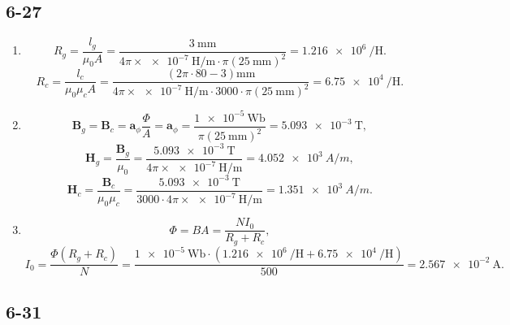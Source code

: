 \documentclass[11pt,a4paper]{article}
\author{\href{liuyh615@sjtu.edu.cn}{Yihao Liu} (515370910207)}
\subtitle{Homework}
\begin{document}
\maketitle

\subsection{6-27}
\begin{enumerate}[label=\alph*)]
\item
$$R_g=\frac{l_g}{\mu_0A}=\frac{\SI{3}{\milli\meter}}{4\pi\times\SI{e-7}{\henry/\meter}\cdot\pi(\SI{25}{\milli\meter})^2}=\SI{1.216e6}{\per\henry}.$$
$$R_c=\frac{l_c}{\mu_0\mu_cA}=\frac{(2\pi\cdot 80-3)\si{\milli\meter}}{4\pi\times\SI{e-7}{\henry/\meter}\cdot3000\cdot\pi(\SI{25}{\milli\meter})^2}=\SI{6.75e4}{\per\henry}.$$
\item
$$\mathbf{B}_g=\mathbf{B}_c=\mathbf{a}_\phi\frac{\Phi}{A}=\mathbf{a}_\phi=\frac{\SI{1e-5}{\weber}}{\pi(\SI{25}{\milli\meter})^2}=\SI{5.093e-3}{\tesla},$$
$$\mathbf{H}_g=\frac{\mathbf{B}_g}{\mu_0}=\frac{\SI{5.093e-3}{\tesla}}{4\pi\times\SI{e-7}{\henry/\meter}}=\SI{4.052e3}{A/m},$$
$$\mathbf{H}_c=\frac{\mathbf{B}_c}{\mu_0\mu_c}=\frac{\SI{5.093e-3}{\tesla}}{3000\cdot4\pi\times\SI{e-7}{\henry/\meter}}=\SI{1.351e3}{A/m}.$$
\item
$$\Phi=BA=\frac{NI_0}{R_g+R_c},$$
$$I_0=\frac{\Phi(R_g+R_c)}{N}=\frac{\SI{1e-5}{\weber}\cdot(\SI{1.216e6}{\per\henry}+\SI{6.75e4}{\per\henry})}{500}=\SI{2.567e-2}{\ampere}.$$
\end{enumerate}

\subsection{6-31}
\end{document}
